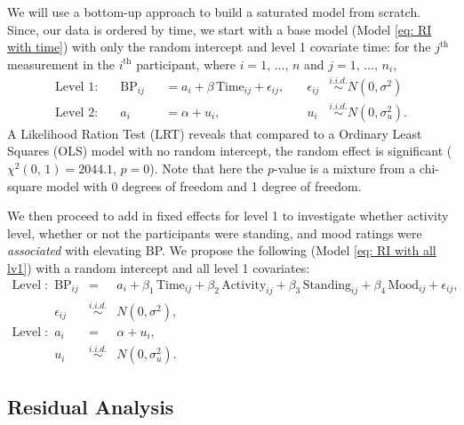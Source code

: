 \documentclass[12pt,twoside,letterpaper]{article}
\theoremstyle{definition}
\theoremstyle{definition}
\begin{document}
We will use a bottom-up approach to build a saturated model from scratch. Since, our data is ordered by time, we start with a base model (Model \ref{eq: RI with time}) with only the random intercept and level 1 covariate time: for the $j^\text{th}$ measurement in the $i^\text{th}$ participant, where $i = 1,\, \ldots,\, n$ and $j = 1,\, \ldots,\, n_i$,
\begin{equation}\label{eq: RI with time}
    \begin{aligned}
        \text{Level 1}: \quad & \text{BP}_{ij} &&= a_i + \beta\, \text{Time}_{ij} + \epsilon_{ij}, \quad & \epsilon_{ij} &\overset{i.i.d.}{\sim} N(0, \sigma^2) \\
        \text{Level 2}: \quad & a_i &&= \alpha + u_i, \quad & u_{i} &\overset{i.i.d.}{\sim} N(0, \sigma_u^2).
    \end{aligned}
\end{equation}
A Likelihood Ration Test (LRT) reveals that compared to a Ordinary Least Squares (OLS) model with no random intercept, the random effect is significant ($\chi^2 (0,\, 1) = 2044.1$, $p = 0$). Note that here the $p$-value is a mixture from a chi-square model with 0 degrees of freedom and 1 degree of freedom.

We then proceed to add in fixed effects for level 1 to investigate whether activity level, whether or not the participants were standing, and mood ratings were \emph{associated} with elevating BP. We propose the following (Model \ref{eq: RI with all lv1}) with a random intercept and all level 1 covariates:
\begin{equation}\label{eq: RI with all lv1}
    \begin{array}{rrcll}
        \text{Level 1}: & \text{BP}_{ij} &=& a_i + \beta_1\, \text{Time}_{ij} + \beta_2\, \text{Activity}_{ij} + \beta_3\, \text{Standing}_{ij} + \beta_4\, \text{Mood}_{ij} + \epsilon_{ij}, \\[0.5ex]
         & \epsilon_{ij} &\overset{i.i.d.}{\sim}& N(0, \sigma^2), \\[0.5ex]
        \text{Level 2}: & a_i &=& \alpha + u_i, \\[0.5ex]
         & u_{i} &\overset{i.i.d.}{\sim}& N(0, \sigma_u^2).
    \end{array}
\end{equation}

\subsection{Residual Analysis}\label{sec: resid}
\end{document}

